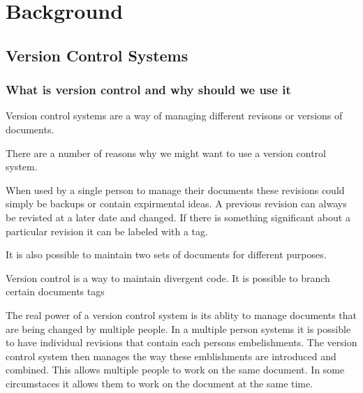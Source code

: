 \chapter{Background}

\section{Version Control Systems}
\subsection{What is version control and why should we use it}
Version control systems are a way of managing different revisons or versions of documents.    


There are a number of reasons why we might want to use a version control system.

When used by a single person to manage their documents these revisions could simply be backups or contain expirmental ideas. A previous revision can always be revisted at a later date and changed. If there is something significant about a particular revision it can be labeled with a tag.  

It is also possible to maintain two sets of documents for different purposes.

Version control is a way to maintain divergent code.
It is possible to branch certain documents
tags

The real power of a version control system is its ablity to manage documents that are being changed by multiple people.  In a multiple person systems it is possible to have individual revisions that contain each persons embelishments. The version control system then manages the way these emblishments are introduced and combined. This allows multiple people to work on the same document. In some circumstaces it allows them to work on the document at the same time.

